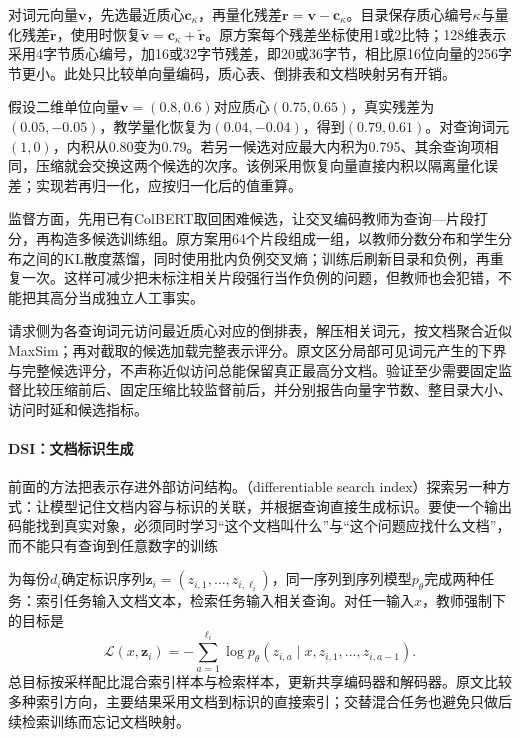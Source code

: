 对词元向量$\bm v$，先选最近质心$\bm c_{\kappa}$，再量化残差$\bm r=\bm v-\bm c_{\kappa}$。目录保存质心编号$\kappa$与量化残差$\widetilde{\bm r}$，使用时恢复$\widetilde{\bm v}=\bm c_{\kappa}+\widetilde{\bm r}$。原方案每个残差坐标使用1或2比特；128维表示采用4字节质心编号，加16或32字节残差，即20或36字节，相比原16位向量的256字节更小。此处只比较单向量编码，质心表、倒排表和文档映射另有开销。

假设二维单位向量$\bm v=(0.8,0.6)$对应质心$(0.75,0.65)$，真实残差为$(0.05,-0.05)$，教学量化恢复为$(0.04,-0.04)$，得到$(0.79,0.61)$。对查询词元$(1,0)$，内积从0.80变为0.79。若另一候选对应最大内积为0.795、其余查询项相同，压缩就会交换这两个候选的次序。该例采用恢复向量直接内积以隔离量化误差；实现若再归一化，应按归一化后的值重算。

监督方面，先用已有ColBERT取回困难候选，让交叉编码教师为查询—片段打分，再构造多候选训练组。原方案用64个片段组成一组，以教师分数分布和学生分布之间的KL散度蒸馏，同时使用批内负例交叉熵；训练后刷新目录和负例，再重复一次。这样可减少把未标注相关片段强行当作负例的问题，但教师也会犯错，不能把其高分当成独立人工事实。

请求侧为各查询词元访问最近质心对应的倒排表，解压相关词元，按文档聚合近似MaxSim；再对截取的候选加载完整表示评分。原文区分局部可见词元产生的下界与完整候选评分，不声称近似访问总能保留真正最高分文档。验证至少需要固定监督比较压缩前后、固定压缩比较监督前后，并分别报告向量字节数、整目录大小、访问时延和候选指标。

\Needspace{135mm}
\paragraph{DSI：文档标识生成}
\label{sec:rs-search-dsi}

前面的方法把表示存进外部访问结构。（differentiable search index）探索另一种方式：让模型记住文档内容与标识的关联，并根据查询直接生成标识。要使一个输出码能找到真实对象，必须同时学习“这个文档叫什么”与“这个问题应找什么文档”，而不能只有查询到任意数字的训练

为每份$d_i$确定标识序列$\bm z_i=(z_{i,1},\ldots,z_{i,\ell_i})$，同一序列到序列模型$p_\theta$完成两种任务：索引任务输入文档文本，检索任务输入相关查询。对任一输入$x$，教师强制下的目标是
\begin{equation}
 \mathcal L(x,\bm z_i)=-\sum_{a=1}^{\ell_i}
     \log p_\theta(z_{i,a}\mid x,z_{i,1},\ldots,z_{i,a-1}).
 \label{eq:rs-search-dsi-objective}
\end{equation}
总目标按采样配比混合索引样本与检索样本，更新共享编码器和解码器。原文比较多种索引方向，主要结果采用文档到标识的直接索引；交替混合任务也避免只做后续检索训练而忘记文档映射。

